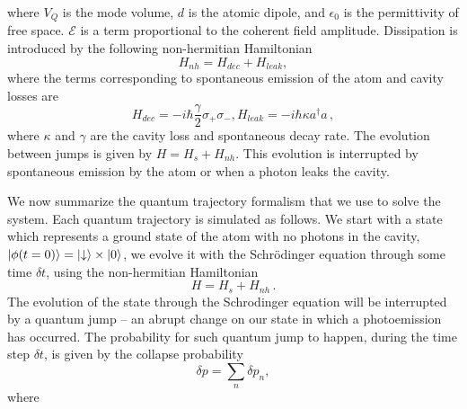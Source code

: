 \documentclass[%
 reprint,
 amsmath,amssymb,
 aps, 
]{revtex4-1}
\begin{document}
where $V_Q$ is the mode volume, $d$ is the atomic dipole, and
$\epsilon_0$ is the permittivity of free space. $\mathcal{E}$ is a term
proportional to the coherent field amplitude. Dissipation is
introduced by the following non-hermitian Hamiltonian
\begin{equation} \label{nh}
H_{nh} = H_{dec} + H_{leak},
\end{equation}
where the terms corresponding to spontaneous emission of the atom and cavity losses are
\begin{subequations}
\begin{equation}
H_{dec} = - i\hbar\frac{\gamma}{2}\sigma_+\sigma_-,
\end{equation}
\begin{equation}
H_{leak} = - i\hbar\kappa a^\dagger a\, ,
\end{equation}
\end{subequations}
where $\kappa$ and $\gamma$ are the cavity loss and spontaneous decay
rate. The evolution between jumps is given by $H=H_s+H_{nh}$. This
evolution is interrupted by spontaneous emission by the atom or when a
photon leaks the cavity. 

We now summarize the quantum trajectory formalism \cite{bla} that we
use to solve the system. Each quantum trajectory is simulated as
follows. We start with a state which represents a ground state of the
atom with no photons in the cavity,
$\ket{\phi(t = 0)} = \ket{\downarrow} \times \ket{0}$, we evolve it
with the Schrödinger equation through some time $\delta t$, using the
non-hermitian Hamiltonian
\begin{equation}
H = H_s +H_{nh}\, .
\end{equation}
The evolution of the state through the Schrodinger equation will be
interrupted by a quantum jump – an abrupt change on our state in which
a photoemission has occurred. The probability for such quantum jump to
happen, during the time step $\delta t$, is given by the collapse
probability
\begin{equation} \label{probcol}
\delta p = \sum_n \delta p_n,
\end{equation}
where
\end{document}
